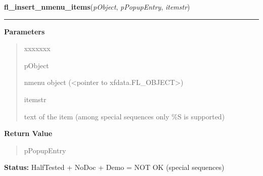 \hspace{.8\funcindent}\begin{boxedminipage}{\funcwidth}

    \raggedright \textbf{fl\_insert\_nmenu\_items}(\textit{pObject}, \textit{pPopupEntry}, \textit{itemstr})

    \vspace{-1.5ex}

    \rule{\textwidth}{0.5\fboxrule}
\setlength{\parskip}{2ex}
\setlength{\parskip}{1ex}
      \textbf{Parameters}
      \vspace{-1ex}

      \begin{quote}
        \begin{Ventry}{xxxxxxx}

          \item[pObject]

          nmenu object ({\textless}pointer to 
          xfdata.FL\_OBJECT{\textgreater})

          \item[itemstr]

          text of the item (among special sequences only \%S is supported)

        \end{Ventry}

      \end{quote}

      \textbf{Return Value}
    \vspace{-1ex}

      \begin{quote}
      pPopupEntry

      \end{quote}

\textbf{Status:} HalfTested + NoDoc + Demo = NOT OK (special sequences)



    \end{boxedminipage}

    \label{xformslib:library:fl_replace_nmenu_item}

    \vspace{0.5ex}

